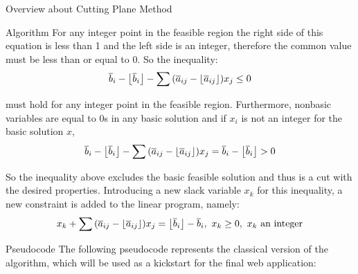 \documentclass[9pt]{extarticle}
\DeclarePairedDelimiter\floor{\lfloor}{\rfloor}
\begin{document}
\begin{section}{Overview about Cutting Plane Method}
\begin{subsection}{Algorithm}
            For any integer point in the feasible region the right side of this equation is less than 1 and the left side is 
            an integer, therefore the common value must be less than or equal to 0. 
            So the inequality:
            \begin{equation*}
                \overline{b}_i - \floor*{
                        \overline{b}_i
                     } - \sum{
                         (\overline{a}_{ij} - \floor*{
                            \overline{a}_{ij}
                        })x_j
                     } \leq 0
            \end{equation*}

            must hold for any integer point in the feasible region. 
            Furthermore, nonbasic variables are equal to 0s in any basic solution and if $x_i$ is not an integer for the basic 
            solution $x$,
            \begin{equation*}
                \overline{b}_i - \floor*{
                        \overline{b}_i
                     } - \sum{
                         (\overline{a}_{ij} - \floor*{
                            \overline{a}_{ij}
                        })x_j
                     } = \overline{b}_i - \floor*{
                        \overline{b}_i
                     } > 0
            \end{equation*}

            So the inequality above excludes the basic feasible solution and thus is a cut with the desired properties. 
            Introducing a new slack variable $x_k$ for this inequality, a new constraint is added to the linear program, namely:
            \begin{equation*}
                x_k + \sum{
                    (\overline{a}_{ij} - \floor*{
                        \overline{a}_{ij}
                    })x_j = \floor*{
                        \overline{b}_i
                     } - \overline{b}_i,\ x_k \ge 0,\ x_k \ \text{an integer}
                }
            \end{equation*}
        \end{subsection}

        \begin{subsection}{Pseudocode}
            The following pseudocode\cite{book} represents the classical version of the algorithm, which will be used as a kickstart
            for the final web application:
            \vspace{10px}


\end{subsection}
\end{section}
\end{document}
